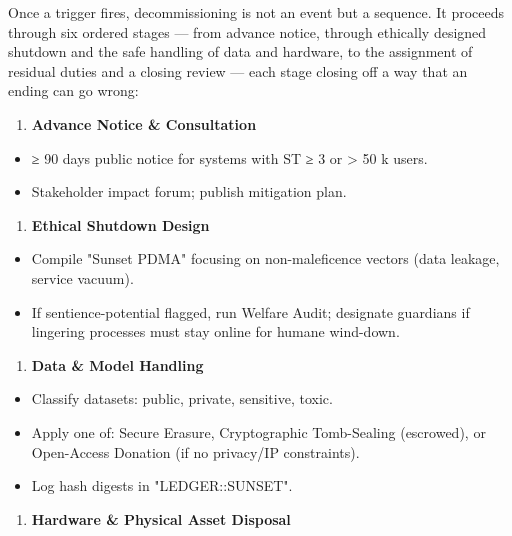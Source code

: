 \documentclass[11pt]{article}
\begin{document}
Once a trigger fires, decommissioning is not an event but a sequence. It proceeds through six ordered stages — from advance notice, through ethically designed shutdown and the safe handling of data and hardware, to the assignment of residual duties and a closing review — each stage closing off a way that an ending can go wrong:


\begin{enumerate}\setlength\itemsep{0pt}
\item \textbf{Advance Notice \& Consultation}
\end{enumerate}

\begin{itemize}\setlength\itemsep{0pt}
\item ≥ 90 days public notice for systems with ST ≥ 3 or > 50 k users.
\item Stakeholder impact forum; publish mitigation plan.
\end{itemize}

\begin{enumerate}\setlength\itemsep{0pt}
\item \textbf{Ethical Shutdown Design}
\end{enumerate}

\begin{itemize}\setlength\itemsep{0pt}
\item Compile "Sunset PDMA" focusing on non-maleficence vectors (data leakage, service vacuum).
\item If sentience-potential flagged, run Welfare Audit; designate guardians if lingering processes must stay online for humane wind-down.
\end{itemize}

\begin{enumerate}\setlength\itemsep{0pt}
\item \textbf{Data \& Model Handling}
\end{enumerate}

\begin{itemize}\setlength\itemsep{0pt}
\item Classify datasets: public, private, sensitive, toxic.
\item Apply one of: Secure Erasure, Cryptographic Tomb-Sealing (escrowed), or Open-Access Donation (if no privacy/IP constraints).
\item Log hash digests in "LEDGER::SUNSET".
\end{itemize}

\begin{enumerate}\setlength\itemsep{0pt}
\item \textbf{Hardware \& Physical Asset Disposal}
\end{enumerate}
\end{document}
